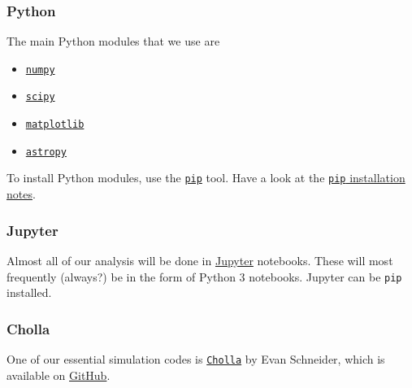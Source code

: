 \subsubsection{Python}
\label{sec:python}

The main Python modules that we use are
\begin{itemize}
	\item \href{https://numpy.org}{\tt numpy}
	\item \href{https://www.scipy.org}{\tt scipy}
	\item \href{https://matplotlib.org}{\tt matplotlib}
	\item \href{https://www.astropy.org}{\tt astropy}
\end{itemize}

\noindent
To install Python modules, use the \href{https://pypi.org/project/pip/}{\tt pip} tool. Have a look at the \href{https://pip.pypa.io/en/stable/installing/}{{\tt pip} installation notes}.

\subsubsection{Jupyter}
\label{sec:jupyter}

Almost all of our analysis will be done in \href{https://jupyter.org/}{Jupyter} notebooks. These will most frequently (always?) be in the form of Python 3 notebooks. Jupyter can be {\tt pip} installed.

\subsubsection{Cholla}
\label{sec:cholla}

One of our essential simulation codes is \href{https://github.com/cholla-hydro/cholla}{{\tt Cholla}} by Evan Schneider, which is available on \href{https://github.com}{GitHub}.

